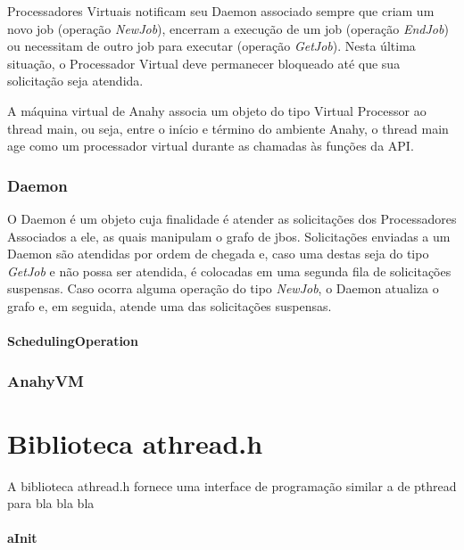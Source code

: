 \documentclass[12pt]{article} usepackage{sbc-template} usepackage{graphicx,url}
\begin{document}
Processadores Virtuais notificam seu Daemon associado sempre que criam um novo job (operação \textit{NewJob}), encerram a execução de um job (operação \textit{EndJob}) ou necessitam de outro job para executar (operação \textit{GetJob}). Nesta última situação, o Processador Virtual deve permanecer bloqueado até que sua solicitação seja atendida.

A máquina virtual de Anahy associa um objeto do tipo Virtual Processor ao thread main, ou seja, entre o início e término do ambiente Anahy, o thread main age como um processador virtual durante as chamadas às funções da API.

\subsubsection{Daemon}

O Daemon é um objeto cuja finalidade é atender as solicitações dos Processadores Associados a ele, as quais manipulam o grafo de jbos. Solicitações enviadas a um Daemon são atendidas por ordem de chegada e, caso uma destas seja do tipo \textit{GetJob} e não possa ser atendida, é colocadas em uma segunda fila de solicitações suspensas. Caso ocorra alguma operação do tipo \textit{NewJob}, o Daemon atualiza o grafo e, em seguida, atende uma das solicitações suspensas.

\paragraph{SchedulingOperation}


\subsubsection{AnahyVM}



\section{Biblioteca athread.h} %
\label{sec:athread}

A biblioteca athread.h fornece uma interface de programação similar a de pthread
para  bla bla bla

\paragraph{aInit}
\end{document}
